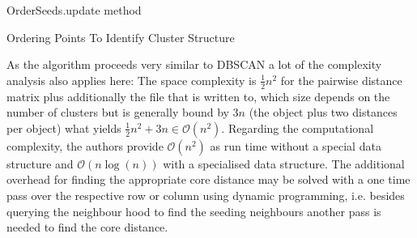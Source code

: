 \begin{algorithm}[htp]
    \hrulealg
\caption{OrderSeeds.update method}\label{order_seeds_update}
\end{algorithm}

\begin{algorithm}[htp]
    \hrulealg
\caption{Ordering Points To Identify Cluster Structure}\label{optics}
\end{algorithm}
As the algorithm proceeds very similar to DBSCAN a lot of the complexity analysis also applies here: The space complexity is $\frac{1}{2}n^2$ for the pairwise distance matrix plus additionally the file that is written to, which size depends on the number of clusters but is generally bound by $3n$ (the object plus two distances per object) what yields $\frac{1}{2}n^2 + 3n \in \mathcal{O}(n^2)$. Regarding the computational complexity, the authors provide $\mathcal{O}(n^2)$ as run time without a special data structure and $\mathcal{O}(n \log(n))$ with a specialised data structure\cite{optics}. The additional overhead for finding the appropriate core distance may be solved with a one time pass over the respective row or column using dynamic programming, i.e. besides querying the neighbour hood to find the seeding neighbours another pass is needed to find the core distance. \\



